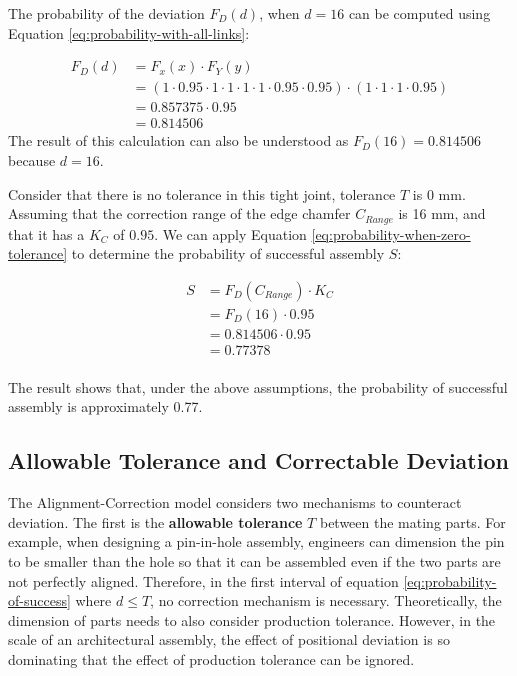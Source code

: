 The probability of the deviation $F_D(d)$, when $d = 16$ can be computed using Equation \ref{eq:probability-with-all-links}:

\begin{align}
    F_D(d) &= F_x(x) \cdot F_Y(y) \nonumber\\
      &= (1 \cdot 0.95 \cdot 1 \cdot 1 \cdot 1 \cdot 1 \cdot 0.95 \cdot 0.95) \cdot (1 \cdot 1 \cdot 1 \cdot 0.95)\nonumber\\
      &= 0.857375 \cdot 0.95\nonumber\\
      &= 0.814506\nonumber
\end{align}
The result of this calculation can also be understood as $F_D(16) = 0.814506$ because $d = 16$.

Consider that there is no tolerance in this tight joint, tolerance $T$ is 0 mm. Assuming that the correction range of the edge chamfer $C_{Range}$ is 16 mm, and that it has a $K_C$ of $0.95$. We can apply Equation \ref{eq:probability-when-zero-tolerance} to determine the probability of successful assembly $S$:

\begin{align}
    S &= F_D(C_{Range}) \cdot K_C \nonumber\\
      &= F_D(16) \cdot 0.95 \nonumber\\
      &=  0.814506 \cdot 0.95 \nonumber\\
      &= 0.77378 \nonumber\\
\end{align}

The result shows that, under the above assumptions, the probability of successful assembly is approximately 0.77. 

\subsection{Allowable Tolerance and Correctable Deviation}
\label{subsection:new-hypo-allowable-tolerance-and-correctable-deviation}

The Alignment-Correction model considers two mechanisms to counteract deviation. The first is the \textbf{allowable tolerance} $T$ between the mating parts. For example, when designing a pin-in-hole assembly, engineers can dimension the pin to be smaller than the hole so that it can be assembled even if the two parts are not perfectly aligned. Therefore, in the first interval of equation \ref{eq:probability-of-success} where $ d \leq T$, no correction mechanism is necessary. Theoretically, the dimension of parts needs to also consider production tolerance. However, in the scale of an architectural assembly, the effect of positional deviation is so dominating that the effect of production tolerance can be ignored.

